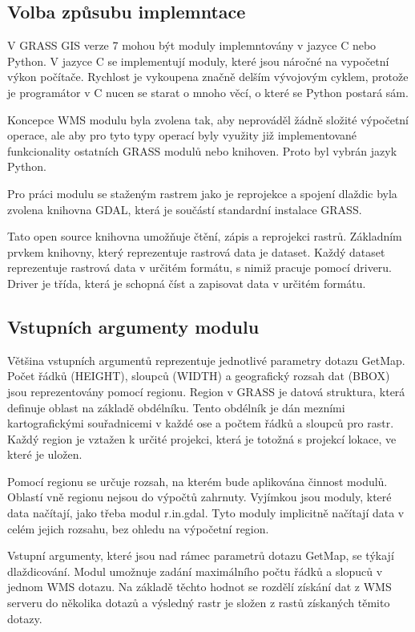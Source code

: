 \documentclass[a4paper,12pt]{article}
\begin{document}
\subsection{Volba způsubu implemntace}

V GRASS GIS verze 7 mohou být moduly implemntovány v jazyce C nebo Python. V jazyce C se implementují moduly, které jsou náročné na vypočetní výkon počítače. 
Rychlost je vykoupena značně delším vývojovým cyklem, protože je programátor v C nucen se starat o mnoho věcí, o které se Python postará sám.

Koncepce WMS modulu byla zvolena tak, aby neprováděl žádně složité výpočetní operace, ale aby pro tyto typy operací byly využity již implementované funkcionality 
ostatních GRASS modulů nebo knihoven. Proto byl vybrán jazyk Python. 

Pro práci modulu se staženým rastrem jako je reprojekce a spojení dlaždic byla zvolena knihovna GDAL, která je součástí standardní instalace GRASS.

Tato open source knihovna umožňuje čtění, zápis a reprojekci rastrů.  
Základním prvkem knihovny, který reprezentuje rastrová data je dataset.  Každý dataset reprezentuje rastrová data v určitém formátu, s nimiž pracuje pomocí driveru. Driver je třída, která je schopná číst a zapisovat data v určitém formátu. 

\subsection{Vstupních argumenty modulu}


Většina vstupních argumentů reprezentuje jednotlivé parametry dotazu GetMap. Počet řádků (HEIGHT), sloupců (WIDTH) a geografický rozsah dat (BBOX) 
jsou reprezentovány pomocí regionu. Region v GRASS je datová struktura, která definuje oblast na základě obdélníku. Tento obdélník je dán mezními kartografickými  souřadnicemi v každé ose a počtem řádků a sloupců pro rastr. Každý region je vztažen k určité projekci, která je totožná s projekcí lokace, ve které je uložen.

Pomocí regionu se určuje rozsah, na kterém bude aplikována činnost modulů.
Oblastí vně regionu nejsou do výpočtů zahrnuty. Vyjímkou jsou moduly, které data načítají, jako třeba modul r.in.gdal. Tyto moduly implicitně načítají data v celém jejich rozsahu, bez ohledu na výpočetní region. 

Vstupní argumenty, které jsou nad rámec parametrů dotazu GetMap, se týkají dlaždicování. Modul umožnuje zadání maximálního počtu řádků 
a slopuců v jednom WMS dotazu. Na základě těchto hodnot se rozdělí získání dat z WMS serveru do několika dotazů a výsledný rastr je složen z rastů získaných těmito dotazy. 
   
\end{document}
